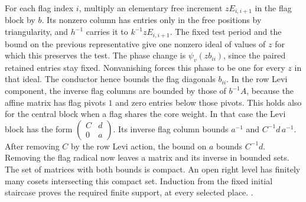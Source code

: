 For each flag index \(i\), multiply an elementary free
increment \(zE_{i,i+1}\) in the flag block by \(b\).
Its nonzero column has entries only in the free positions
by triangularity, and \(h^{-1}\) carries it to
\(k^{-1}zE_{i,i+1}\). The fixed test period and the bound on
the previous representative give one nonzero ideal of
values of \(z\) for which this preserves the test. The
phase change is \(\psi_v(zb_{ii})\), since the paired
retained entries stay fixed. Nonvanishing forces this
phase to be one for every \(z\) in that ideal. The
conductor hence bounds the flag diagonals \(b_{ii}\).
In the row Levi component, the inverse flag columns are
bounded by those of \(b^{-1}A\), because the affine matrix
has flag pivots \(1\) and zero entries below those pivots.
This holds also for the central block when a flag shares
the core weight. In that case the Levi block has the form
\(\left(\begin{smallmatrix}C&d\\0&a\end{smallmatrix}\right)\).
Its inverse flag column bounds \(a^{-1}\) and
\(C^{-1}d\,a^{-1}\). After removing \(C\) by the row
Levi action, the bound on \(a\) bounds \(C^{-1}d\).
Removing the flag radical now leaves a matrix and its
inverse in bounded sets. The set of matrices with both
bounds is compact. An open right level has finitely
many cosets intersecting this compact set. Induction
from the fixed initial staircase proves the required
finite support, at every selected place.
.

